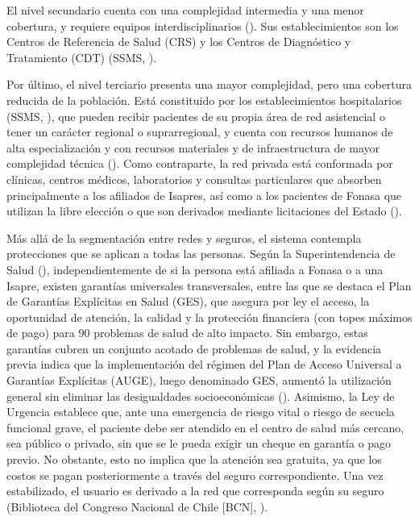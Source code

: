 \documentclass[
  spanish,
  a4paper,
  oneside]{scrbook}
\begin{document}
El nivel secundario cuenta con una complejidad intermedia y una menor
cobertura, y requiere equipos interdisciplinarios
(). Sus establecimientos
son los Centros de Referencia de Salud (CRS) y los Centros de
Diagnóstico y Tratamiento (CDT) (SSMS,
).

Por último, el nivel terciario presenta una mayor complejidad, pero una
cobertura reducida de la población. Está constituido por los
establecimientos hospitalarios (SSMS,
), que pueden recibir pacientes de su
propia área de red asistencial o tener un carácter regional o
suprarregional, y cuenta con recursos humanos de alta especialización y
con recursos materiales y de infraestructura de mayor complejidad
técnica (). Como
contraparte, la red privada está conformada por clínicas, centros
médicos, laboratorios y consultas particulares que absorben
principalmente a los afiliados de Isapres, así como a los pacientes de
Fonasa que utilizan la libre elección o que son derivados mediante
licitaciones del Estado ().

Más allá de la segmentación entre redes y seguros, el sistema contempla
protecciones que se aplican a todas las personas. Según la
Superintendencia de Salud
(),
independientemente de si la persona está afiliada a Fonasa o a una
Isapre, existen garantías universales transversales, entre las que se
destaca el Plan de Garantías Explícitas en Salud (GES), que asegura por
ley el acceso, la oportunidad de atención, la calidad y la protección
financiera (con topes máximos de pago) para 90 problemas de salud de
alto impacto. Sin embargo, estas garantías cubren un conjunto acotado de
problemas de salud, y la evidencia previa indica que la implementación
del régimen del Plan de Acceso Universal a Garantías Explícitas (AUGE),
luego denominado GES, aumentó la utilización general sin eliminar las
desigualdades socioeconómicas (). Asimismo, la Ley de Urgencia establece que, ante una
emergencia de riesgo vital o riesgo de secuela funcional grave, el
paciente debe ser atendido en el centro de salud más cercano, sea
público o privado, sin que se le pueda exigir un cheque en garantía o
pago previo. No obstante, esto no implica que la atención sea gratuita,
ya que los costos se pagan posteriormente a través del seguro
correspondiente. Una vez estabilizado, el usuario es derivado a la red
que corresponda según su seguro (Biblioteca del Congreso Nacional de
Chile {[}BCN{]}, ).
\end{document}
